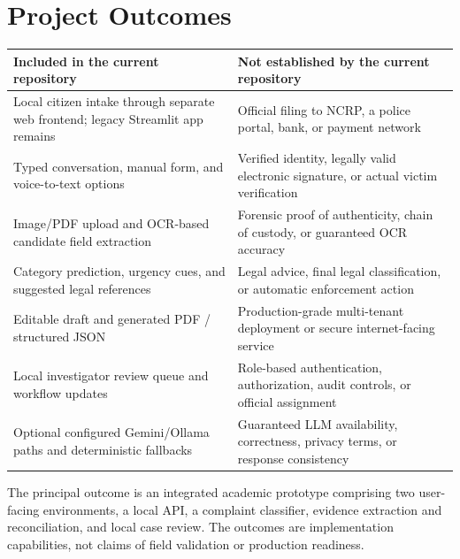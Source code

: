 \documentclass[12pt,a4paper,oneside]{report}
\begin{document}
\section{Project Outcomes}
\begin{longtable}{|>{\RaggedRight\arraybackslash}p{}|>{\RaggedRight\arraybackslash}p{}|}
\hline
\textbf{Included in the current repository} & \textbf{Not established by the current repository} \\\hline
Local citizen intake through separate web frontend; legacy Streamlit app remains & Official filing to NCRP, a police portal, bank, or payment network \\\hline
Typed conversation, manual form, and voice-to-text options & Verified identity, legally valid electronic signature, or actual victim verification \\\hline
Image/PDF upload and OCR-based candidate field extraction & Forensic proof of authenticity, chain of custody, or guaranteed OCR accuracy \\\hline
Category prediction, urgency cues, and suggested legal references & Legal advice, final legal classification, or automatic enforcement action \\\hline
Editable draft and generated PDF / structured JSON & Production-grade multi-tenant deployment or secure internet-facing service \\\hline
Local investigator review queue and workflow updates & Role-based authentication, authorization, audit controls, or official assignment \\\hline
Optional configured Gemini/Ollama paths and deterministic fallbacks & Guaranteed LLM availability, correctness, privacy terms, or response consistency \\\hline
\end{longtable}
\vspace{2mm}
The principal outcome is an integrated academic prototype comprising two user-facing environments, a local API, a complaint classifier, evidence extraction and reconciliation, and local case review. The outcomes are implementation capabilities, not claims of field validation or production readiness.\par\medskip
\end{document}
